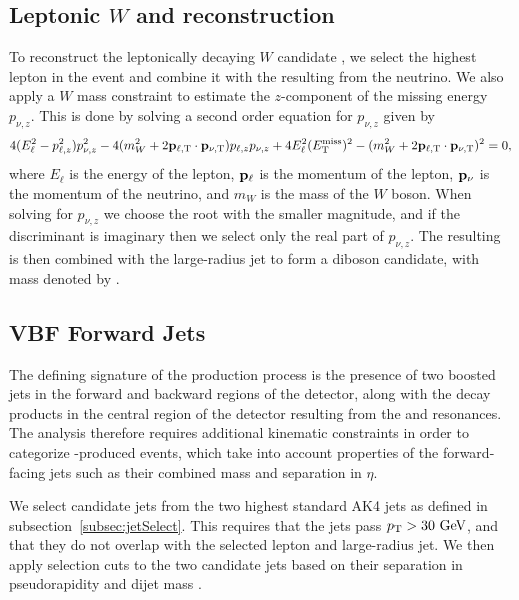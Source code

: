 \subsection{Leptonic $W$ and \WV reconstruction}

To reconstruct the leptonically decaying $W$ candidate \Wlep, we select the highest \pt lepton in the event and combine it with the \EtmissTI resulting from the neutrino.
We also apply a $W$ mass constraint to estimate the $z$-component of the missing energy $p_{\nu,z}$.
This is done by solving a second order equation for $p_{\nu,z}$ given by
\begin{equation}
  4(E_\ell^2-p_{\ell,z}^2)p_{\nu,z}^2-4(m_W^2+2\vb{p}_{\ell,\mathrm{T}}\cdot\vb{p}_{\nu,\mathrm{T}})p_{\ell,z}p_{\nu,z}+4E_\ell^2(\Etmiss)^2-(m_W^2+2\vb{p}_{\ell,\mathrm{T}}\cdot\vb{p}_{\nu,\mathrm{T}})^2=0,
\end{equation}
where $E_\ell$ is the energy of the lepton, $\vb{p}_\ell$ is the momentum of the lepton, $\vb{p}_\nu$ is the momentum of the neutrino, and $m_W$ is the mass of the $W$ boson.
When solving for $p_{\nu,z}$ we choose the root with the smaller magnitude, and if the discriminant is imaginary then we select only the real part of $p_{\nu,z}$.
The resulting \Wlep is then combined with the large-radius \Vhad jet to form a diboson candidate, with mass denoted by \MVV.

\subsection{VBF Forward Jets}
\label{subsec:VBFjets}

The defining signature of the \VBF production process is the presence of two boosted jets in the forward and backward regions of the detector, along with the decay products in the central region of the detector resulting from the \Wlep and \Vhad resonances.
The analysis therefore requires additional kinematic constraints in order to categorize \VBF-produced events, which take into account properties of the forward-facing \VBF jets such as their combined mass and separation in $\eta$.

We select candidate \VBF jets from the two highest \pt standard AK4 jets as defined in subsection~\ref{subsec:jetSelect}.
This requires that the \VBF jets pass $\pt>30\unit{GeV}$, and that they do not overlap with the selected lepton and large-radius jet.
We then apply selection cuts to the two candidate \VBF jets based on their separation in pseudorapidity \DetaVBF and \VBF dijet mass \mjjVBF.

